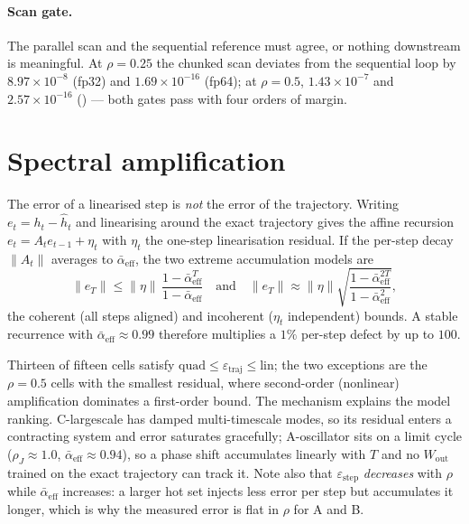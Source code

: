 \documentclass[11pt]{article}
\theoremstyle{definition}
\newcommand{\abar}{\bar{\alpha}_{\mathrm{eff}}}
\newcommand{\code}[1]{\texttt{\detokenize{#1}}}
\begin{document}
\paragraph{Scan gate.} The parallel scan and the sequential reference must agree, or nothing downstream is
meaningful. At $\rho=0.25$ the chunked scan deviates from the sequential loop by $8.97\times10^{-8}$ (fp32)
and $1.69\times10^{-16}$ (fp64); at $\rho=0.5$, $1.43\times10^{-7}$ and $2.57\times10^{-16}$
(\code{results/phase2_scan_check.json}) --- both gates pass with four orders of margin.

\section{Spectral amplification}\label{sec:amp}

The error of a linearised step is \emph{not} the error of the trajectory. Writing
$e_t = h_t - \hat h_t$ and linearising around the exact trajectory gives the affine recursion
$e_t = A_t e_{t-1} + \eta_t$ with $\eta_t$ the one-step linearisation residual. If the per-step decay
$\|A_t\|$ averages to $\abar$, the two extreme accumulation models are
\begin{equation}
\|e_T\| \le \|\eta\|\,\frac{1-\abar^{T}}{1-\abar}
\quad\text{and}\quad
\|e_T\| \approx \|\eta\|\sqrt{\frac{1-\abar^{2T}}{1-\abar^{2}}},
\label{eq:gain}
\end{equation}
the coherent (all steps aligned) and incoherent ($\eta_t$ independent) bounds. A stable recurrence with
$\abar\approx0.99$ therefore multiplies a $1\%$ per-step defect by up to $100$.

\begin{table}[H]
\centering
\caption{Measured amplification at the longest horizon ($T=512$ for A/B, $T=1024$ for C).
$\varepsilon_{\text{step}}$ is the per-step linearisation residual along the approximate trajectory (local) and
at the exact state (exact); $\abar$ is the mean per-step decay; the bounds are
\eqref{eq:gain}. \emph{in}/\emph{out} marks whether the measured trajectory error falls inside them.}
\label{tab:amp}
\small

\end{table}

Thirteen of fifteen cells satisfy
$\text{quad}\le\varepsilon_{\text{traj}}\le\text{lin}$; the two exceptions are the $\rho=0.5$ cells with the
smallest residual, where second-order (nonlinear) amplification dominates a first-order bound. The mechanism
explains the model ranking. C-largescale has damped multi-timescale modes, so its residual enters a
contracting system and error saturates gracefully; A-oscillator sits on a limit cycle
($\rho_J\approx1.0$, $\abar\approx0.94$), so a phase shift accumulates linearly with $T$ and no
$W_{\text{out}}$ trained on the exact trajectory can track it. Note also that $\varepsilon_{\text{step}}$
\emph{decreases} with $\rho$ while $\abar$ increases: a larger hot set injects less error per step but
accumulates it longer, which is why the measured error is flat in $\rho$ for A and B.
\end{document}
